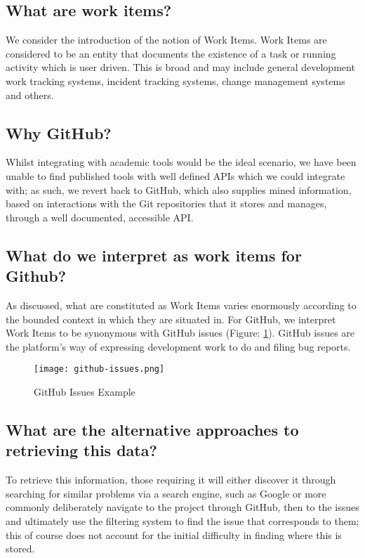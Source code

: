 
\subsection{What are work items?}

We consider the introduction of the notion of Work Items. Work Items are considered to be an entity that documents the existence of a task or running activity which is user driven. This is broad and may include general development work tracking systems, incident tracking systems, change management systems and others.

\subsection{Why GitHub?}

Whilst integrating with academic tools would be the ideal scenario, we have been unable to find published tools with well defined APIs which we could integrate with; as such, we revert back to GitHub, which also supplies mined information, based on interactions with the Git repositories that it stores and manages, through a well documented, accessible API.

\subsection{What do we interpret as work items for Github?}

As discussed, what are constituted as Work Items varies enormously according to the bounded context in which they are situated in. For GitHub, we interpret Work Items to be synonymous with GitHub issues (Figure: \ref{fig:githubIssuesExample}). GitHub issues are the platform's way of expressing development work to do and filing bug reports.

\begin{figure}[h!]
	\centering
	\texttt{[image: github-issues.png]}
	\caption{GitHub Issues Example}
	\label{fig:githubIssuesExample}

\end{figure}

\subsection{What are the alternative approaches to retrieving this data?}

To retrieve this information, those requiring it will either discover it through searching for similar problems via a search engine, such as Google or more commonly deliberately navigate to the project through GitHub, then to the issues and ultimately use the filtering system to find the issue that corresponds to them; this of course does not account for the initial difficulty in finding where this is stored.

